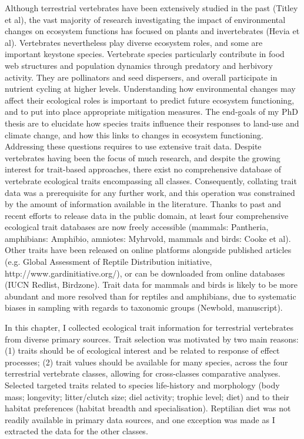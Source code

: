 Although terrestrial vertebrates have been extensively studied in the past (Titley et al), the vast majority of research investigating the impact of environmental changes on ecosystem functions has focused on plants and invertebrates (Hevia et al). Vertebrates nevertheless play diverse ecosystem roles, and some are important keystone species.  Vertebrate species particularly contribute in food web structures and population dynamics through predatory and herbivory activity. They are pollinators and seed dispersers, and overall participate in nutrient cycling at higher levels. Understanding how environmental changes may affect their ecological roles is important to predict future ecosystem functioning, and to put into place appropriate mitigation measures. The end-goals of my PhD thesis are to elucidate how species traits influence their responses to land-use and climate change, and how this links to changes in ecosystem functioning. Addressing these questions requires to use extensive trait data. Despite vertebrates having been the focus of much research, and despite the growing interest for trait-based approaches, there exist no comprehensive database of vertebrate ecological traits encompassing all classes. Consequently, collating trait data was a prerequisite for any further work, and this operation was constrained by the amount of information available in the literature. Thanks to past and recent efforts to release data in the public domain, at least four comprehensive ecological trait databases are now freely accessible (mammals: Pantheria, amphibians: Amphibio, amniotes: Myhrvold, mammals and birds: Cooke et al). Other traits have been released on online platforms alongside published articles (e.g. Global Assessment of Reptile Distribution initiative, http://www.gardinitiative.org/), or can be downloaded from online databases (IUCN Redlist, Birdzone). Trait data for mammals and birds is likely to be more abundant and more resolved than for reptiles and amphibians, due to systematic biases in sampling with regards to taxonomic groups (Newbold, manuscript).
 
In this chapter, I collected ecological trait information for terrestrial vertebrates from diverse primary sources. Trait selection was motivated by two main reasons: (1) traits should be of ecological interest and be related to response of effect processes; (2) trait values should be available for many species, across the four terrestrial vertebrate classes, allowing for cross-classes comparative analyses. Selected targeted traits related to species life-history and morphology (body mass; longevity; litter/clutch size; diel activity; trophic level; diet) and to their habitat preferences (habitat breadth and specialisation). Reptilian diet was not readily available in primary data sources, and one exception was made as I extracted the data for the other classes.

